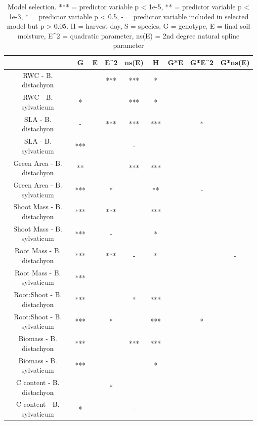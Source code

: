 \documentclass[jou,floatsintext]{apa6}
\begin{document}
\begin{table}[tbp]
\begin{center}
\begin{threeparttable}
\caption{\label{tab:models}Model selection. *** = predictor variable p < 1e-5, ** = predictor variable p < 1e-3, * = predictor variable p < 0.5, - = predictor variable included in selected model but p > 0.05. H = harvest day, S = species, G = genotype, E = final soil moisture, E\textasciicircum{}2 = quadratic parameter, ns(E) = 2nd degree natural spline parameter}
\scriptsize{
\begin{tabular}{ccccccccc}
\toprule
 & \multicolumn{1}{c}{G} & \multicolumn{1}{c}{E} & \multicolumn{1}{c}{E\textasciicircum{}2} & \multicolumn{1}{c}{ns(E)} & \multicolumn{1}{c}{H} & \multicolumn{1}{c}{G*E} & \multicolumn{1}{c}{G*E\textasciicircum{}2} & \multicolumn{1}{c}{G*ns(E)}\\
\midrule
RWC - B. distachyon &  &  & *** & *** & * &  &  & \\ \midrule
RWC - B. sylvaticum & * &  &  & *** & * &  &  & \\ \midrule
SLA - B. distachyon & - &  & *** & *** & *** &  & * & \\ \midrule
SLA - B. sylvaticum & *** &  &  & - &  &  &  & \\ \midrule
Green Area - B. distachyon & ** &  &  & *** & *** &  &  & \\ \midrule
Green Area - B. sylvaticum & *** &  & * &  & ** &  & - & \\ \midrule
Shoot Mass - B. distachyon & *** &  & *** &  & *** &  &  & \\ \midrule
Shoot Mass - B. sylvaticum & *** &  & - &  & * &  &  & \\ \midrule
Root Mass - B. distachyon & *** &  & *** & - & * &  &  & -\\ \midrule
Root Mass - B. sylvaticum & *** &  &  &  &  &  &  & \\ \midrule
Root:Shoot - B. distachyon & *** &  &  & * & *** &  &  & \\ \midrule
Root:Shoot - B. sylvaticum & *** &  & * &  & *** &  & * & \\ \midrule
Biomass - B. distachyon & *** &  &  & *** & *** &  &  & \\ \midrule
Biomass - B. sylvaticum & *** &  &  &  & * &  &  & \\ \midrule
C content - B. distachyon &  &  & * &  &  &  &  & \\ \midrule
C content - B. sylvaticum & * &  &  & - &  &  &  & \\ \midrule

\end{tabular}}
\end{threeparttable}
\end{center}
\end{table}
\end{document}
